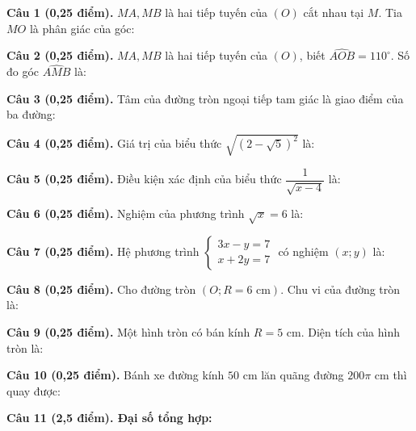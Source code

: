 \documentclass[12pt,a4paper]{article}
\begin{document}
\vspace{1.2mm}
\noindent\textbf{Câu 1 (0,25 điểm).} $MA, MB$ là hai tiếp tuyến của $(O)$ cắt nhau tại $M$. Tia $MO$ là phân giác của góc: \par\vspace{0.5mm}
\noindent\textbf{Câu 2 (0,25 điểm).} $MA, MB$ là hai tiếp tuyến của $(O)$, biết $\widehat{AOB} = 110^\circ$. Số đo góc $\widehat{AMB}$ là: \par\vspace{0.5mm}
\noindent\textbf{Câu 3 (0,25 điểm).} Tâm của đường tròn ngoại tiếp tam giác là giao điểm của ba đường: \par\vspace{0.5mm}
\noindent\textbf{Câu 4 (0,25 điểm).} Giá trị của biểu thức $\sqrt{(2 - \sqrt{5})^2}$ là: \par\vspace{0.5mm}
\noindent\textbf{Câu 5 (0,25 điểm).} Điều kiện xác định của biểu thức $\dfrac{1}{\sqrt{x - 4}}$ là: \par\vspace{0.5mm}
\noindent\textbf{Câu 6 (0,25 điểm).} Nghiệm của phương trình $\sqrt{x} = 6$ là: \par\vspace{0.5mm}
\noindent\textbf{Câu 7 (0,25 điểm).} Hệ phương trình $\begin{cases} 3x - y = 7 \\ x + 2y = 7 \end{cases}$ có nghiệm $(x; y)$ là: \par\vspace{0.5mm}
\noindent\textbf{Câu 8 (0,25 điểm).} Cho đường tròn $(O; R = 6\text{ cm})$. Chu vi của đường tròn là: \par\vspace{0.5mm}
\noindent\textbf{Câu 9 (0,25 điểm).} Một hình tròn có bán kính $R = 5\text{ cm}$. Diện tích của hình tròn là: \par\vspace{0.5mm}
\noindent\textbf{Câu 10 (0,25 điểm).} Bánh xe đường kính $50\text{ cm}$ lăn quãng đường $200\pi\text{ cm}$ thì quay được: \par\vspace{0.5mm}
\vspace{0.8mm}
\noindent\textbf{Câu 11 (2,5 điểm). Đại số tổng hợp:}
\vspace{0.6mm}
\end{document}
